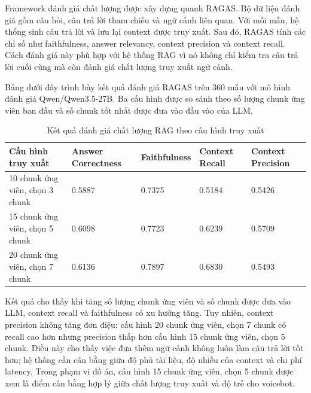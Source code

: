 \documentclass[a4paper,13pt,oneside]{report}
\begin{document}
Framework đánh giá chất lượng được xây dựng quanh RAGAS. Bộ dữ liệu đánh giá gồm câu hỏi, câu trả lời tham chiếu và ngữ cảnh liên quan. Với mỗi mẫu, hệ thống sinh câu trả lời và lưu lại context được truy xuất. Sau đó, RAGAS tính các chỉ số như faithfulness, answer relevancy, context precision và context recall. Cách đánh giá này phù hợp với hệ thống RAG vì nó không chỉ kiểm tra câu trả lời cuối cùng mà còn đánh giá chất lượng truy xuất ngữ cảnh.

Bảng dưới đây trình bày kết quả đánh giá RAGAS trên 360 mẫu với mô hình đánh giá Qwen/Qwen3.5-27B. Ba cấu hình được so sánh theo số lượng chunk ứng viên ban đầu và số chunk tốt nhất được đưa vào đầu vào của LLM.

\begin{table}[H]
    \centering
    \caption{Kết quả đánh giá chất lượng RAG theo cấu hình truy xuất}
    \begin{tabular}{|p{3.2cm}|p{2.6cm}|p{2.5cm}|p{2.5cm}|p{2.5cm}|}
        \hline
        \textbf{Cấu hình truy xuất}     & \textbf{Answer Correctness} & \textbf{Faithfulness} & \textbf{Context Recall} & \textbf{Context Precision} \\
        \hline
        10 chunk ứng viên, chọn 3 chunk & 0.5887                      & 0.7375                & 0.5184                  & 0.5426                     \\
        \hline
        15 chunk ứng viên, chọn 5 chunk & 0.6098                      & 0.7723                & 0.6239                  & 0.5709                     \\
        \hline
        20 chunk ứng viên, chọn 7 chunk & 0.6136                      & 0.7897                & 0.6830                  & 0.5493                     \\
        \hline
    \end{tabular}
\end{table}

Kết quả cho thấy khi tăng số lượng chunk ứng viên và số chunk được đưa vào LLM, context recall và faithfulness có xu hướng tăng. Tuy nhiên, context precision không tăng đơn điệu: cấu hình 20 chunk ứng viên, chọn 7 chunk có recall cao hơn nhưng precision thấp hơn cấu hình 15 chunk ứng viên, chọn 5 chunk. Điều này cho thấy việc đưa thêm ngữ cảnh không luôn làm câu trả lời tốt hơn; hệ thống cần cân bằng giữa độ phủ tài liệu, độ nhiễu của context và chi phí latency. Trong phạm vi đồ án, cấu hình 15 chunk ứng viên, chọn 5 chunk được xem là điểm cân bằng hợp lý giữa chất lượng truy xuất và độ trễ cho voicebot.
\end{document}
